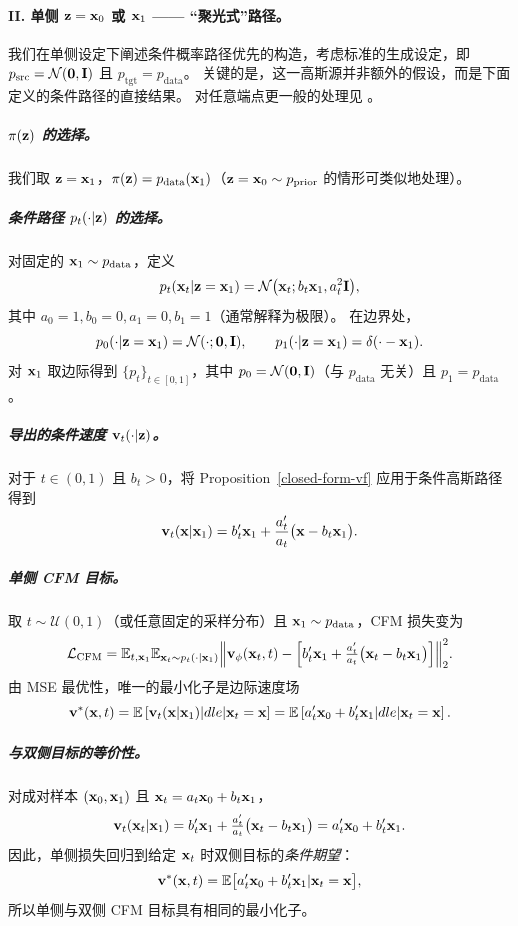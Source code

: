 \paragraph{II. 单侧 ${\mathbf{z}} = {\mathbf{x}}_0$ 或 ${\mathbf{x}}_1$ —— “聚光式”路径。}
我们在单侧设定下阐述条件概率路径优先的构造，考虑标准的生成设定，即 $p_{\mathrm{src}}=\mathcal N(\bm 0,{\mathbf{I}})$ 且 $p_{\mathrm{tgt}}=p_{\mathrm{data}}$。
关键的是，这一高斯源并非额外的假设，而是下面定义的条件路径的直接结果。
对任意端点更一般的处理见 。

\subparagraph{$\pi({\mathbf{z}})$ 的选择。}
我们取 ${\mathbf{z}}={\mathbf{x}}_1$，$\pi({\mathbf{z}})=p_{\mathrm{data}}({\mathbf{x}}_1)$（${\mathbf{z}}={\mathbf{x}}_0\sim p_{\mathrm{prior}}$ 的情形可类似地处理）。

\subparagraph{条件路径 $p_t(\cdot|{\mathbf{z}})$ 的选择。}
对固定的 ${\mathbf{x}}_1\sim p_{\mathrm{data}}$，定义
\[
p_t({\mathbf{x}}_t|{\mathbf{z}}={\mathbf{x}}_1)=\mathcal N \big({\mathbf{x}}_t; b_t {\mathbf{x}}_1, a_t^2 {\mathbf{I}}\big),
\]
其中 $ a_0=1, b_0=0, a_1=0, b_1=1$（通常解释为极限）。
在边界处，
\[
p_0(\cdot|{\mathbf{z}}={\mathbf{x}}_1)=\mathcal N(\cdot; \bm 0,{\mathbf{I}}),\qquad
p_1(\cdot|{\mathbf{z}}={\mathbf{x}}_1)=\delta(\cdot - {\mathbf{x}}_1).
\]
对 ${\mathbf{x}}_1$ 取边际得到 $\{p_t\}_{t\in[0,1]}$，其中
$p_0=\mathcal N(\bm 0,{\mathbf{I}})$（与 $p_{\mathrm{data}}$ 无关）且 $p_1=p_{\mathrm{data}}$。

\subparagraph{导出的条件速度 ${\mathbf{v}}_t(\cdot|{\mathbf{z}})$。}
对于 $t\in(0,1)$ 且 $b_t>0$，将 Proposition~\ref{closed-form-vf} 应用于条件高斯路径得到
\[
\mathbf v_t({\mathbf{x}}|{\mathbf{x}}_1)
= b_t' {\mathbf{x}}_1 + \frac{a_t'}{a_t} \big({\mathbf{x}} - b_t {\mathbf{x}}_1\big).
\]

\subparagraph{单侧 CFM 目标。}
取 $t\sim\mathcal U(0,1)$（或任意固定的采样分布）且 ${\mathbf{x}}_1\sim p_{\mathrm{data}}$，CFM 损失变为
\begin{align}\label{eq:one-sided-cfm}
    \mathcal L_{\mathrm{CFM}}
=\mathbb{E}_{t,{\mathbf{x}}_1} \mathbb{E}_{{\mathbf{x}}_t\sim p_t(\cdot|{\mathbf{x}}_1)}
\Big\|\mathbf v_\phi({\mathbf{x}}_t,t)-
\Big[b_t'{\mathbf{x}}_1+\tfrac{a_t'}{a_t}\big({\mathbf{x}}_t-b_t{\mathbf{x}}_1\big)\Big]\Big\|_2^2.
\end{align}
由 MSE 最优性，唯一的最小化子是边际速度场
\[
\mathbf v^*({\mathbf{x}},t)
= \mathbb{E} \left[\mathbf v_t({\mathbf{x}}|{\mathbf{x}}_1) |dle|  {\mathbf{x}}_t={\mathbf{x}}\right]
= \mathbb{E} \left[a_t'{\mathbf{x}}_0+b_t'{\mathbf{x}}_1 |dle|  {\mathbf{x}}_t={\mathbf{x}}\right].
\]

\subparagraph{与双侧目标的等价性。}
对成对样本 $({\mathbf{x}}_0,{\mathbf{x}}_1)$ 且 ${\mathbf{x}}_t=a_t{\mathbf{x}}_0+b_t{\mathbf{x}}_1$，
\[
\mathbf v_t({\mathbf{x}}_t|{\mathbf{x}}_1)
= b_t'{\mathbf{x}}_1 + \tfrac{a_t'}{a_t}\big({\mathbf{x}}_t-b_t{\mathbf{x}}_1\big)
= a_t'{\mathbf{x}}_0 + b_t'{\mathbf{x}}_1.
\]
因此，单侧损失回归到给定 ${\mathbf{x}}_t$ 时双侧目标的\emph{条件期望}：
\[
\mathbf v^*({\mathbf{x}},t)=\mathbb{E} \big[a_t'{\mathbf{x}}_0 + b_t'{\mathbf{x}}_1 | {\mathbf{x}}_t={\mathbf{x}}\big],
\]
所以单侧与双侧 CFM 目标具有相同的最小化子。


